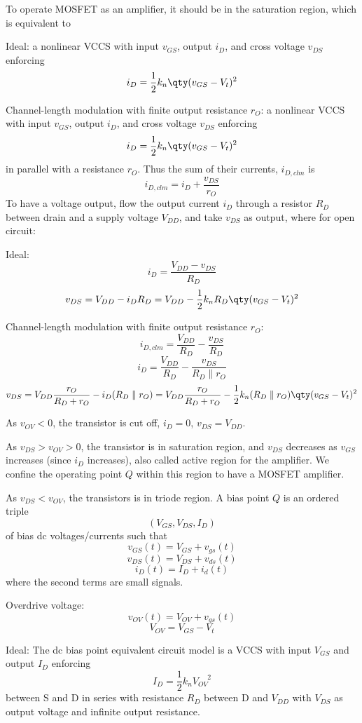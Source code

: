 \documentclass[a4paper,12pt]{report}
\begin{document}
To operate MOSFET as an amplifier, it should be in the saturation region, which is equivalent to
\bit
\item Ideal: a nonlinear VCCS with input $v_{GS}$, output $i_D$, and cross voltage $v_{DS}$ enforcing
\[i_D=\frac{1}{2}k_n\qty(v_{GS}-V_t)^2\]
\item Channel-length modulation with finite output resistance $r_O$: a nonlinear VCCS with input $v_{GS}$, output $i_D$, and cross voltage $v_{DS}$ enforcing
\[i_D=\frac{1}{2}k_n\qty(v_{GS}-V_t)^2\]
in parallel with a resistance $r_O$. Thus the sum of their currents, $i_{D,clm}$ is
\[i_{D,clm}=i_D+\frac{v_{DS}}{r_O}\]
\eit
{}
To have a voltage output, flow the output current $i_D$ through a resistor $R_D$ between drain and a supply voltage $V_{DD}$, and take $v_{DS}$ as output, where for open circuit:
\bit
\item Ideal:
\[i_D=\frac{V_{DD}-v_{DS}}{R_D}\]
\[v_{DS}=V_{DD}-i_DR_D=V_{DD}-\frac{1}{2}k_nR_D\qty(v_{GS}-V_t)^2\]
\item Channel-length modulation with finite output resistance $r_O$:
\[i_{D,clm}=\frac{V_{DD}}{R_D}-\frac{v_{DS}}{R_D}\]
\[i_D=\frac{V_{DD}}{R_D}-\frac{v_{DS}}{R_D\parallel r_O}\]
\[v_{DS}=V_{DD}\frac{r_O}{R_D+r_O}-i_D(R_D\parallel r_O)=V_{DD}\frac{r_O}{R_D+r_O}-\frac{1}{2}k_n(R_D\parallel r_O)\qty(v_{GS}-V_t)^2\]
\eit
{}
\bit
\item As $v_{OV}<0$, the transistor is cut off, $i_D=0$, $v_{DS}=V_{DD}$.
\item As $v_{DS}>v_{OV}>0$, the transistor is in saturation region, and $v_{DS}$ decreases as $v_{GS}$ increases (since $i_D$ increases), also called active region for the amplifier. We confine the operating point $Q$ within this region to have a MOSFET amplifier.
\item As $v_{DS}<v_{OV}$, the transistors is in triode region.
\eit
{}
A bias point $Q$ is an ordered triple
\[(V_{GS},V_{DS},I_D)\]
of bias dc voltages/currents such that
\[v_{GS}(t)=V_{GS}+v_{gs}(t)\]
\[v_{DS}(t)=V_{DS}+v_{ds}(t)\]
\[i_D(t)=I_D+i_d(t)\]
where the second terms are small signals.

Overdrive voltage:
\[v_{OV}(t)=V_{OV}+v_{gs}(t)\]
\[V_{OV}=V_{GS}-V_t\]
\bit
\item Ideal: The dc bias point equivalent circuit model is a VCCS with input $V_{GS}$ and output $I_D$ enforcing
\[I_D=\frac{1}{2}k_nV_{OV}^{\phantom{OV}2}\]
between S and D in series with resistance $R_D$ between D and $V_{DD}$ with $V_{DS}$ as output voltage and infinite output resistance.
\end{document}
